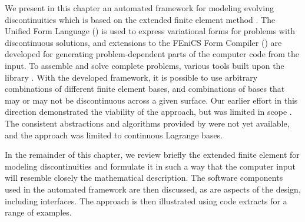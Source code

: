 We present in this chapter an automated framework for modeling
evolving discontinuities which is based on the extended finite element
method \citep{belytschko:1999,moes:1999,wells:2001}.  The Unified Form
Language (\ufl) is used to express variational forms for problems with
discontinuous solutions, and extensions to the FEniCS Form Compiler (\ffc)
are developed for generating problem-dependent parts of the computer code
from the \ufl{} input. To assemble and solve complete problems, various
tools built upon the library \dolfin.  With the developed framework, it is
possible to use arbitrary combinations of different finite element bases,
and combinations of bases that may or may not be discontinuous across
a given surface. Our earlier effort in this direction demonstrated the
viability of the approach, but was limited in scope \citep{nikbakht:2009}.
The consistent abstractions and algorithms provided by {\ufl} were not
yet available, and the approach was limited to continuous Lagrange bases.

In the remainder of this chapter, we review briefly the extended finite
element for modeling discontinuities and formulate it in such a way that
the computer input will resemble closely the mathematical description. The
software components used in the automated framework are then discussed,
as are aspects of the design, including interfaces. The approach is then
illustrated using code extracts for a range of examples.
